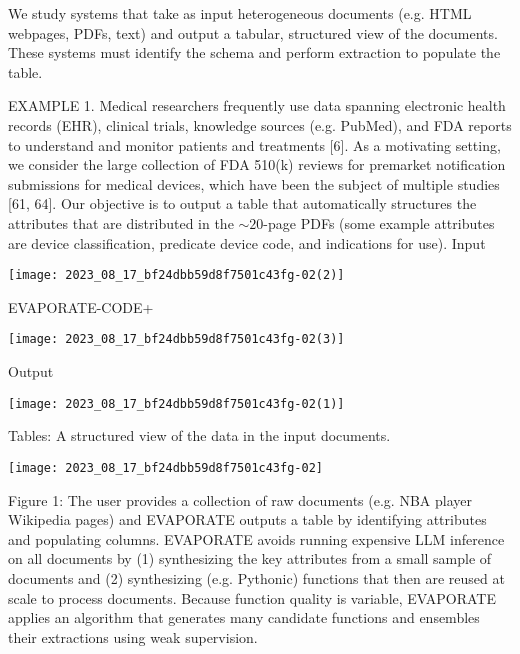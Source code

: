 \documentclass[10pt]{article}
\begin{document}
We study systems that take as input heterogeneous documents (e.g. HTML webpages, PDFs, text) and output a tabular, structured view of the documents. These systems must identify the schema and perform extraction to populate the table.

EXAMPLE 1. Medical researchers frequently use data spanning electronic health records (EHR), clinical trials, knowledge sources (e.g. PubMed), and FDA reports to understand and monitor patients and treatments [6]. As a motivating setting, we consider the large collection of FDA 510(k) reviews for premarket notification submissions for medical devices, which have been the subject of multiple studies [61, 64]. Our objective is to output a table that automatically structures the attributes that are distributed in the $\sim 20$-page PDFs (some example attributes are device classification, predicate device code, and indications for use). Input

\begin{center}
\texttt{[image: 2023\_08\_17\_bf24dbb59d8f7501c43fg-02(2)]}
\end{center}

EVAPORATE-CODE+

\begin{center}
\texttt{[image: 2023\_08\_17\_bf24dbb59d8f7501c43fg-02(3)]}
\end{center}

Output

\begin{center}
\texttt{[image: 2023\_08\_17\_bf24dbb59d8f7501c43fg-02(1)]}
\end{center}

Tables: A structured view of the data in the input documents.

\begin{center}
\texttt{[image: 2023\_08\_17\_bf24dbb59d8f7501c43fg-02]}
\end{center}

Figure 1: The user provides a collection of raw documents (e.g. NBA player Wikipedia pages) and EVAPORATE outputs a table by identifying attributes and populating columns. EVAPORATE avoids running expensive LLM inference on all documents by (1) synthesizing the key attributes from a small sample of documents and (2) synthesizing (e.g. Pythonic) functions that then are reused at scale to process documents. Because function quality is variable, EVAPORATE applies an algorithm that generates many candidate functions and ensembles their extractions using weak supervision.
\end{document}
